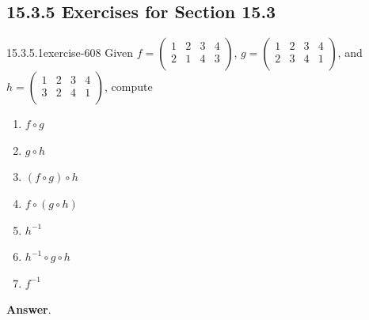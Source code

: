 \documentclass[twoside,10pt,]{book}
\numberwithin{equation}{section}
\begin{document}
\subsection*{15.3.5 Exercises for Section 15.3}
\begin{divisionsolution}{15.3.5.1}{}{exercise-608}%
\hypertarget{p-5484}{}%
Given \(f=\left(
\begin{array}{cccc}
1 & 2 & 3 & 4 \\
2 & 1 & 4 & 3 \\
\end{array}
\right)\), \(g=\left(
\begin{array}{cccc}
1 & 2 & 3 & 4 \\
2 & 3 & 4 & 1 \\
\end{array}
\right)\), and \(h=\left(
\begin{array}{cccc}
1 & 2 & 3 & 4 \\
3 & 2 & 4 & 1 \\
\end{array}
\right)\), compute\leavevmode%
\begin{multicols}{2}
\begin{enumerate}[label=(\alph*)]
\item\hypertarget{li-2429}{}\hypertarget{p-5485}{}%
\(f\circ g\)%
\item\hypertarget{li-2430}{}\hypertarget{p-5486}{}%
\(g\circ h\)%
\item\hypertarget{li-2431}{}\hypertarget{p-5487}{}%
\((f\circ g)\circ h\)%
\item\hypertarget{li-2432}{}\hypertarget{p-5488}{}%
\(f\circ (g\circ h)\)%
\item\hypertarget{li-2433}{}\hypertarget{p-5489}{}%
\(h^{-1}\)%
\item\hypertarget{li-2434}{}\hypertarget{p-5490}{}%
\(h^{-1} \circ g\circ h\)%
\item\hypertarget{li-2435}{}\hypertarget{p-5491}{}%
\(f^{-1}\)%
\end{enumerate}
\end{multicols}
%
\par\smallskip%
\noindent\textbf{Answer}.\quad%
\hypertarget{p-5492}{}%
\leavevmode%
\begin{multicols}{2}
\end{multicols}
\end{divisionsolution}
\end{document}
